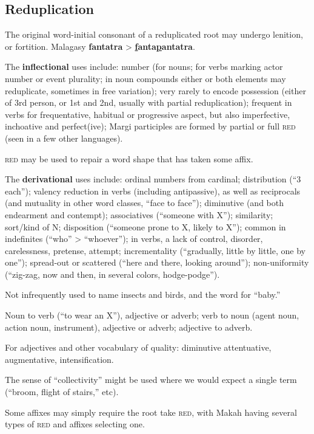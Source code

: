 \documentclass[11pt]{article}
\newcommand{\LL}[1]{\textbf{#1}}  %
\newcommand{\I}[1]{\textsc{#1}}   %
\begin{document}
\subsection{Reduplication} The original word-initial consonant of a
reduplicated root may undergo lenition, or fortition.  Malagasy
\LL{fantatra} > \LL{\uline{f}anta\uline{p}antatra}.

The \textbf{inflectional} uses include: number (for nouns; for verbs
marking actor number or event plurality; in noun compounds either or
both elements may reduplicate, sometimes in free variation); very
rarely to encode possession (either of 3rd person, or 1st and 2nd,
usually with partial reduplication); frequent in verbs for
frequentative, habitual or progressive aspect, but also imperfective,
inchoative and perfect(ive); Margi participles are formed by partial
or full \I{red} (seen in a few other languages).

\I{red} may be used to repair a word shape that has taken some affix.

The \textbf{derivational} uses include: ordinal numbers from cardinal;
distribution (``3 each''); valency reduction in verbs (including
antipassive), as well as reciprocals (and mutuality in other word
classes, ``face to face''); diminutive (and both endearment and
contempt); associatives (``someone with X''); similarity; sort/kind of
N; disposition (``someone prone to X, likely to X''); common in
indefinites (``who'' > ``whoever''); in verbs, a lack of control,
disorder, carelessness, pretense, attempt; incrementality
(``gradually, little by little, one by one''); spread-out or scattered
(``here and there, looking around''); non-uniformity (``zig-zag, now
and then, in several colors, hodge-podge'').

Not infrequently used to name insects and birds, and the word for
``baby.'' 

Noun to verb (``to wear an X''), adjective or adverb; verb to noun
(agent noun, action noun, instrument), adjective or adverb; adjective
to adverb.

For adjectives and other vocabulary of quality: diminutive
attentuative, augmentative, intensification.

The sense of ``collectivity'' might be used where we would expect a
single term (``broom, flight of stairs,'' etc).

Some affixes may simply require the root take \I{red}, with Makah
having several types of \I{red} and affixes selecting one.
\end{document}
